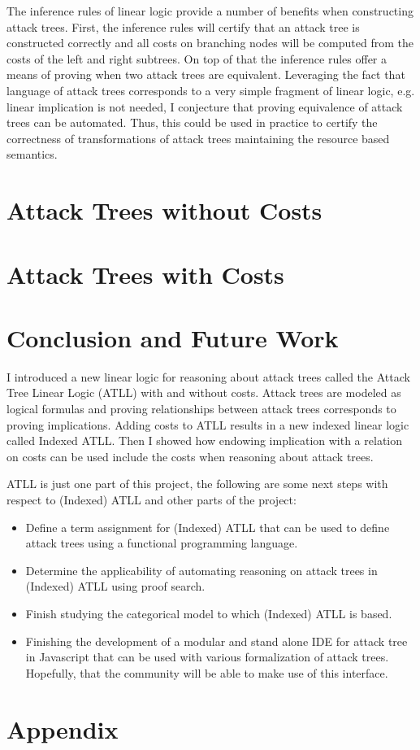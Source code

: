 \documentclass{llncs}
\begin{document}
The inference rules of linear logic provide a number of benefits when
constructing attack trees.  First, the inference rules will certify
that an attack tree is constructed correctly and all costs on
branching nodes will be computed from the costs of the left and right
subtrees.  On top of that the inference rules offer a means of proving
when two attack trees are equivalent. Leveraging the fact that
language of attack trees corresponds to a very simple fragment of
linear logic, e.g. linear implication is not needed, I conjecture
that proving equivalence of attack trees can be automated.  Thus, this
could be used in practice to certify the correctness of
transformations of attack trees maintaining the resource based
semantics.

\section{Attack Trees without Costs}
\label{sec:attack_trees_without_costs}


\section{Attack Trees with Costs}
\label{sec:attack_trees_with_costs}


\section{Conclusion and Future Work}
\label{sec:conclusion}
I introduced a new linear logic for reasoning about attack trees
called the Attack Tree Linear Logic (ATLL) with and without costs.
Attack trees are modeled as logical formulas and proving relationships
between attack trees corresponds to proving implications.  Adding
costs to ATLL results in a new indexed linear logic called Indexed
ATLL.  Then I showed how endowing implication with a relation on costs
can be used include the costs when reasoning about attack trees.

ATLL is just one part of this project, the following are some next
steps with respect to (Indexed) ATLL and other parts of the project:
\begin{itemize}
\item Define a term assignment for (Indexed) ATLL that can be used to
  define attack trees using a functional programming language.
\item Determine the applicability of automating reasoning on attack
  trees in (Indexed) ATLL using proof search.  
\item Finish studying the categorical model to which (Indexed) ATLL is
  based.
\item Finishing the development of a modular and stand alone IDE for
  attack tree in Javascript that can be used with various
  formalization of attack trees.  Hopefully, that the community will
  be able to make use of this interface.
\end{itemize}





\appendix

\section*{Appendix}
\label{sec:appendix}

\end{document}
